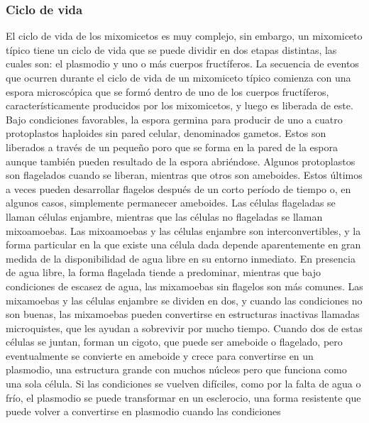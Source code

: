 \subsubsection{Ciclo de vida}
    El ciclo de vida de los mixomicetos es muy complejo, sin embargo, un mixomiceto t\'ipico
        tiene un ciclo de vida que se puede dividir en dos etapas distintas, las cuales son:
        el plasmodio y uno o m\'as cuerpos fruct\'iferos.\cite{Stephenson1994}
    \vskip 0.5cm
    La secuencia de eventos que ocurren durante el ciclo de vida de un mixomiceto t\'ipico comienza con una espora 
        microsc\'opica que se form\'o dentro de uno de los cuerpos fruct\'iferos, caracter\'isticamente 
        producidos por los mixomicetos, y luego es liberada de este.  Bajo condiciones favorables, la 
        espora germina para producir de uno a cuatro protoplastos haploides sin pared
        celular, denominados gametos. Estos son liberados a trav\'es de un peque\~no poro que se forma en la pared de la espora aunque tambi\'en pueden resultado 
        de la espora abri\'endose.
    \vskip 0.5cm
    Algunos protoplastos son flagelados cuando se liberan, mientras que otros son ameboides. Estos \'ultimos a veces pueden desarrollar flagelos despu\'es de un 
        corto per\'iodo de tiempo o, en algunos casos, simplemente permanecer ameboides. Las c\'elulas flageladas se llaman c\'elulas enjambre, mientras que las 
        c\'elulas no flageladas se llaman mixoamoebas. Las mixoamoebas y las c\'elulas enjambre son interconvertibles, y la forma particular en la que existe una 
        c\'elula dada depende aparentemente en gran medida de la disponibilidad de agua libre en su entorno inmediato. En presencia de agua libre, la forma 
        flagelada tiende a predominar, mientras que bajo condiciones de escasez de agua, las mixamoebas sin flagelos son m\'as comunes.\cite{Stephenson1994}
    \vskip 0.5cm
    Las mixamoebas y las c\'elulas enjambre se dividen en dos, y cuando las condiciones no son buenas, 
        las mixamoebas pueden convertirse en estructuras inactivas llamadas microquistes, que les ayudan a sobrevivir 
        por mucho tiempo. Cuando dos de estas c\'elulas se juntan, forman un cigoto, que puede ser ameboide o flagelado, pero 
        eventualmente se convierte en ameboide y crece para convertirse en un plasmodio, una estructura grande con muchos n\'ucleos 
        pero que funciona como una sola c\'elula. Si las condiciones se vuelven dif\'iciles, como por la falta de agua o fr\'io, el plasmodio 
        se puede transformar en un esclerocio, una forma resistente que puede volver a convertirse en plasmodio cuando las condiciones 
